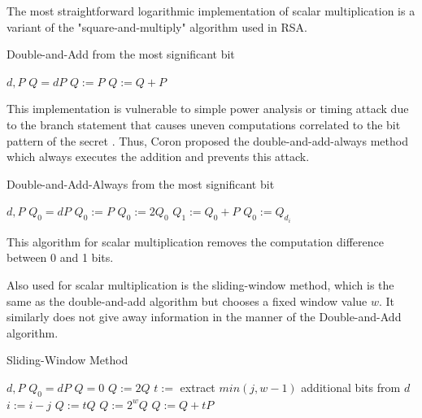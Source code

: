 \documentclass{article}
\let\oldReturn\Return
\renewcommand{\Return}{\State\oldReturn}
\begin{document}
    The most straightforward logarithmic implementation of scalar multiplication
    is a variant of the "square-and-multiply" algorithm used in RSA.

    \begin{algorithm}
        \caption{Double-and-Add from the most significant bit}
        \label{Double-and-Add}
        \begin{algorithmic}
            \Require $d, P$
            \Ensure $Q = dP$
            \State $Q := P$
                    \State $Q := Q + P$
                \EndIf
            \EndFor
        \end{algorithmic}
    \end{algorithm}

    This implementation is vulnerable to simple power analysis or timing attack
    due to the branch statement that causes uneven computations correlated to
    the bit pattern of the secret \cite{coron1999resistance}. Thus, Coron
    proposed the double-and-add-always method which always executes the
    addition and prevents this attack.

    \begin{algorithm}
        \caption{Double-and-Add-Always from the most significant bit}
        \label{Double-and-Add-Always}
        \begin{algorithmic}
            \Require $d, P$
            \Ensure $Q_0 = dP$
            \State $Q_0 := P$
                \State $Q_0 := 2Q_0$
                \State $Q_1 := Q_0 + P$
                \State $Q_0 := Q_{d_i}$
            \EndFor
        \end{algorithmic}
    \end{algorithm}

    This algorithm for scalar multiplication removes the computation difference
    between 0 and 1 bits.

    Also used for scalar multiplication is the sliding-window method, which is
    the same as the double-and-add algorithm but chooses a fixed window value
    $w$. It similarly does not give away information in the manner of the
    Double-and-Add algorithm.

    \begin{algorithm}
        \caption{Sliding-Window Method}
        \label{Sliding-Window Method}
        \begin{algorithmic}
            \Require $d, P$
            \Ensure $Q_0 = dP$
            \State $Q = 0$
                    \State $Q := 2Q$
                \Else
                    \State $t := $ extract $min(j, w-1)$ additional bits from $d$
                    \State $i := i - j$
                        \State $Q := tQ$ 
                    \Else
                        \State $Q := 2^wQ$
                        \State $Q := Q + tP$
                    \EndIf
                \EndIf
            \EndFor
        \end{algorithmic}
    \end{algorithm}
\end{document}
